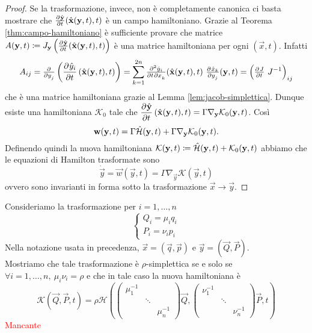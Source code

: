 \begin{proof}
    Se la trasformazione, invece, non è completamente canonica ci basta mostrare che $ \pd{\hat{\vec{y}}}{t}(\hat{\vec{x}}(\vec{y}, t), t) $ è un campo hamiltoniano. Grazie al Teorema \ref{thm:campo-hamiltoniano} è sufficiente provare che matrice $ A(\vec{y}, t) \coloneqq J_\vec{y} \left(\pd{\hat{\vec{y}}}{t}(\hat{\vec{x}}(\vec{y}, t), t)\right) $ è una matrice hamiltoniana per ogni $ (\vec{x}, t) $. Infatti
    \[
        A_{ij} = \pd{}{y_j} \left(\dpd{\hat{y}_i}{t}(\hat{\vec{x}}(\vec{y}, t), t)\right) = \sum_{k=1}^{2n} \md{\hat{y}_i}{2}{t}{}{x_k}{} (\hat{\vec{x}}(\vec{y}, t), t) \ \pd{\hat{x}_k}{y_j} (\vec{y}, t) = \left(\pd{J}{t} \ J^{-1}\right)_{ij}
    \]
    che è una matrice hamiltoniana grazie al Lemma \ref{lem:jacob-simplettica}. Dunque esiste una hamiltoniana $ \mathcal{K}_0 $ tale che $ \dpd{\hat{\vec{y}}}{t}(\hat{\vec{x}}(\vec{y}, t), t) = \Gamma \nabla_\vec{y} \mathcal{K}_0(\vec{y}, t) $. Così
    \[
        \mathbf{w}(\mathbf{y}, t) = \Gamma \hat{\mathcal{H}}(\mathbf{y}, t) + \Gamma \nabla_{\mathbf{y}} \mathcal{K}_0(\mathbf{y}, t).
    \]
    Definendo quindi la nuova hamiltoniana $ \mathcal{K}(\mathbf{y}, t) \coloneqq \hat{\mathcal{H}}(\mathbf{y}, t) + \mathcal{K}_0(\mathbf{y}, t) $ abbiamo che le equazioni di Hamilton trasformate sono
    \[
        \dot{\vec{y}} = \vec{w}(\vec{y}, t) = \Gamma \nabla_\vec{y} \mathcal{K}(\vec{y}, t)
    \]
    ovvero sono invarianti in forma sotto la trasformazione $ \vec{x} \to \vec{y} $.
\end{proof}

\begin{example}
    Consideriamo la trasformazione per $ i = 1, \ldots, n $
    \[
        \begin{cases}
            Q_i = \mu_i q_i \\
            P_i = \nu_i p_i
        \end{cases}
    \]
    Nella notazione usata in precedenza, $ \vec{x} = (\vec{q}, \vec{p}) $ e $ \vec{y} = (\vec{Q}, \vec{P}) $. \\
    Mostriamo che tale trasformazione è $ \rho $-simplettica se e solo se $ \forall i = 1, \ldots, n, \ \mu_i \nu_i = \rho $ e che in tale caso la nuova hamiltoniana è
    \[
        \mathcal{K}(\vec{Q}, \vec{P}, t) = \rho \mathcal{H}\left(
        \begin{pmatrix}
            \mu_1^{-1} & & \\
            & \ddots & \\
            & & \mu_n^{-1}
        \end{pmatrix}
        \vec{Q},
        \begin{pmatrix}
            \nu_1^{-1} & & \\
            & \ddots & \\
            & & \nu_n^{-1}
        \end{pmatrix}
        \vec{P},
        t
        \right)
    \]
    \textcolor{red}{Mancante}
\end{example}

